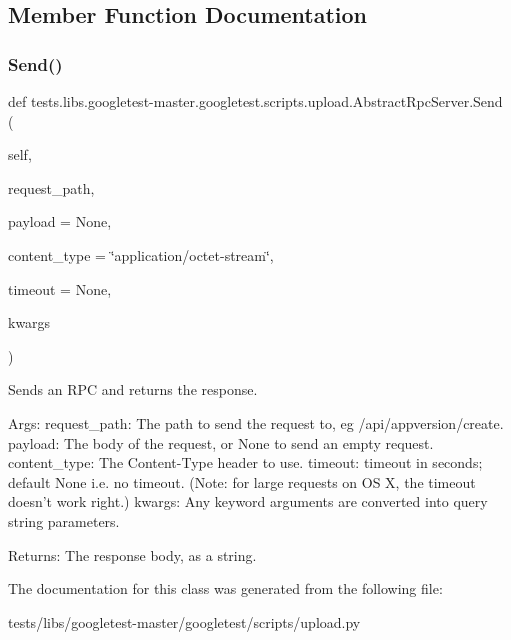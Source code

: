 \subsection{Member Function Documentation}
\mbox{\label{classtests_1_1libs_1_1googletest-master_1_1googletest_1_1scripts_1_1upload_1_1AbstractRpcServer_acaa86b0b73f5dba9fb55b384f69b1a6b}} 
\subsubsection{\texorpdfstring{Send()}{Send()}}
{\footnotesize\ttfamily def tests.\+libs.\+googletest-\/master.\+googletest.\+scripts.\+upload.\+Abstract\+Rpc\+Server.\+Send (\begin{DoxyParamCaption}\item[{}]{self,  }\item[{}]{request\+\_\+path,  }\item[{}]{payload = {\ttfamily None},  }\item[{}]{content\+\_\+type = {\ttfamily \char`\"{}application/octet-\/stream\char`\"{}},  }\item[{}]{timeout = {\ttfamily None},  }\item[{}]{kwargs }\end{DoxyParamCaption})}

\begin{DoxyVerb}Sends an RPC and returns the response.

Args:
  request_path: The path to send the request to, eg /api/appversion/create.
  payload: The body of the request, or None to send an empty request.
  content_type: The Content-Type header to use.
  timeout: timeout in seconds; default None i.e. no timeout.
(Note: for large requests on OS X, the timeout doesn't work right.)
  kwargs: Any keyword arguments are converted into query string parameters.

Returns:
  The response body, as a string.
\end{DoxyVerb}
 

The documentation for this class was generated from the following file\+:\begin{DoxyCompactItemize}
\item 
tests/libs/googletest-\/master/googletest/scripts/upload.\+py\end{DoxyCompactItemize}
